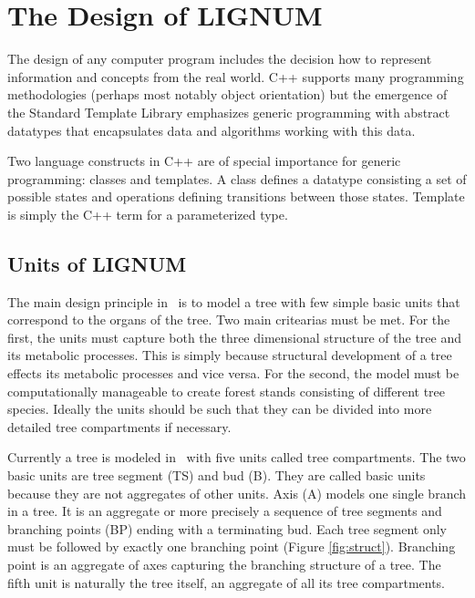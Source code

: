 \chapter{The Design of LIGNUM}

The  design of  any  computer  program includes  the  decision how  to
represent information  and concepts from the real  world. C++ supports
many   programming   methodologies   (perhaps  most   notably   object
orientation)  but  the  emergence  of the  Standard  Template  Library
emphasizes   generic   programming   with  abstract   datatypes   that
encapsulates data and algorithms  working with this data. 

Two language  constructs in C++ are  of special importance for generic
programming: classes  and   templates.   A class  defines   a datatype
consisting   a  set of   possible   states  and  operations   defining
transitions between those states. Template  is simply the C++ term for
a parameterized type.

\section{Units of LIGNUM} 

The main design principle  in  \lignum\ is to  model  a tree with  few
simple basic units that correspond to the organs of the tree. Two main
critearias must  be met.  For the first,  the  units must capture both
the  three  dimensional   structure of  the   tree   and its metabolic
processes.   This is simply because  structural  development of a tree
effects  its metabolic processes and  vice versa.  For the second, the
model must  be  computationally  manageable  to create   forest stands
consisting of  different  tree species.   Ideally  the units should be
such that they can be divided  into more detailed tree compartments if
necessary.

Currently a tree is  modeled in \lignum\  with five units called  tree
compartments.  The two basic units are  tree segment (TS) and bud (B).
They are called basic  units because they  are not aggregates of other
units.   Axis  (A) models one   single  branch in a    tree.  It is an
aggregate or more precisely a  sequence of tree segments and branching
points (BP) ending with  a  terminating bud.   Each tree segment  only
must be followed by exactly one branching point (Figure
\ref{fig:struct}).  Branching point is an  aggregate of axes capturing
the branching structure of  a tree.  The fifth  unit is  naturally the
tree itself, an aggregate of all its tree compartments.

